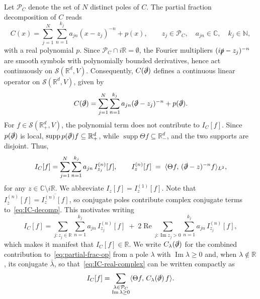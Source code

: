 \documentclass[10pt,a4paper,oneside,reqno]{amsart}
\newcommand{\reals}{\mathbb{R}}
\renewcommand{\Re}{\operatorname{Re}}
\renewcommand{\Im}{\operatorname{Im}}
\begin{document}
Let $\mathcal{P}_C$ denote the set of $N$ distinct poles of $C$. The partial fraction decomposition of $C$ reads
\begin{equation}\label{eq:partial-frac}
    C(x) = \sum_{j=1}^{N} \sum_{n=1}^{k_j} a_{jn}(x - z_j)^{-n} + p(x), \qquad z_j \in \mathcal{P}_C, \quad a_{jn} \in \mathbb{C}, \quad k_j \in \mathbb{N},
\end{equation}
with a real polynomial $p$.
Since $\mathcal{P}_C \cap i\mathbb{R}=\emptyset$, the Fourier multipliers $(i\slashed p-z_j)^{-n}$ are smooth symbols with polynomially bounded derivatives, hence act continuously on $\mathcal S(\mathbb R^d,V)$. Consequently, $C(\slashed\partial)$ defines a continuous linear operator on $\mathcal{S}(\mathbb{R}^d,V)$, given by
\begin{equation}\label{eq:partial-frac-op}
    C(\slashed{\partial}) = \sum_{j=1}^{N} \sum_{n=1}^{k_j} a_{jn}(\slashed{\partial} - z_j)^{-n} + p(\slashed{\partial}).
\end{equation}
For $f \in \mathcal{S}(\mathbb{R}^d_+, V)$, the polynomial term does not contribute to $I_C[f]$. Since $p(\slashed{\partial})$ is local, $\operatorname{supp} p(\slashed{\partial})f \subseteq \mathbb{R}^d_+$, while $\operatorname{supp} \Theta f \subseteq \mathbb{R}^d_-$, and the two supports are disjoint. Thus,
\begin{equation}\label{eq:IC-decomp}
    I_C[f] = \sum_{j=1}^{N} \sum_{n=1}^{k_j} a_{jn}\, I_{z_j}^{(n)}[f], \qquad I_z^{(n)}[f] \;=\; \langle \Theta f,\, (\slashed{\partial} - z)^{-n} f \rangle_{L^2},
\end{equation}
for any $z \in \mathbb{C} \setminus i\mathbb{R}$. We abbreviate $I_z[f] = I_z^{(1)}[f]$.
Note that $I_{\bar{z}}^{(n)}[f] = \overline{I_z^{(n)}[f]}$, so conjugate poles contribute complex conjugate terms to~\eqref{eq:IC-decomp}. This motivates writing
\begin{equation}\label{eq:IC-real-complex}
I_C[f] = \sum_{j:z_j \in\reals} \sum_{n=1}^{k_j} a_{jn}\, I_{z_j}^{(n)}[f] \;+\; 2\Re \sum_{j:\Im z_j > 0} \sum_{n=1}^{k_j} a_{jn}\, I_{z_j}^{(n)}[f],
\end{equation}
which makes it manifest that $I_C[f] \in \mathbb{R}$. We write $C_\lambda(\slashed{\partial})$ for the combined contribution to~\eqref{eq:partial-frac-op} from a pole $\lambda$ with $\operatorname{Im}\lambda \geq 0$ and, when $\lambda \notin \mathbb{R}$, its conjugate $\bar{\lambda}$, so that~\eqref{eq:IC-real-complex} can be written compactly as
\begin{equation}
    I_C[f] = \sum_{\substack{\lambda \in \mathcal{P}_C \\ \operatorname{Im}\lambda \geq 0}} \langle \Theta f,\, C_\lambda(\slashed{\partial})\, f \rangle.
\end{equation}
\end{document}
